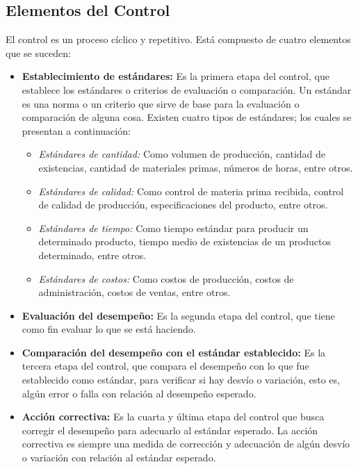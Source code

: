 \documentclass[12pt,letterpaper]{article}
\begin{document}
\subsection{Elementos del Control}
El control es un proceso cíclico y repetitivo. Está compuesto de cuatro elementos que se suceden:
\begin{itemize}
\item \textbf{Establecimiento de estándares:} Es la primera etapa del control, que establece los estándares o criterios de evaluación o comparación. Un estándar es una norma o un criterio que sirve de base para la evaluación o comparación de alguna cosa. Existen cuatro tipos de estándares; los cuales se presentan a continuación:
\begin{itemize}
\item \textit{Estándares de cantidad:} Como volumen de producción, cantidad de existencias, cantidad de materiales primas, números de horas, entre otros.
\item \textit{Estándares de calidad:} Como control de materia prima recibida, control de calidad de producción, especificaciones del producto, entre otros.
\item \textit{Estándares de tiempo:} Como tiempo estándar para producir un determinado producto, tiempo medio de existencias de un productos determinado, entre otros.
\item \textit{Estándares de costos:} Como costos de producción, costos de administración, costos de ventas, entre otros.
\end{itemize}
\item \textbf{Evaluación del desempeño:} Es la segunda etapa del control, que tiene como fin evaluar lo que se está haciendo.
\item \textbf{Comparación del desempeño con el estándar establecido:} Es la tercera etapa del control, que compara el desempeño con lo que fue establecido como estándar, para verificar si hay desvío o variación, esto es, algún error o falla con relación al desempeño esperado.
\item \textbf{Acción correctiva:} Es la cuarta y última etapa del control que busca corregir el desempeño para adecuarlo al estándar esperado. La acción correctiva es siempre una medida de corrección y adecuación de algún desvío o variación con relación al estándar esperado.
\end{itemize}
\end{document}
